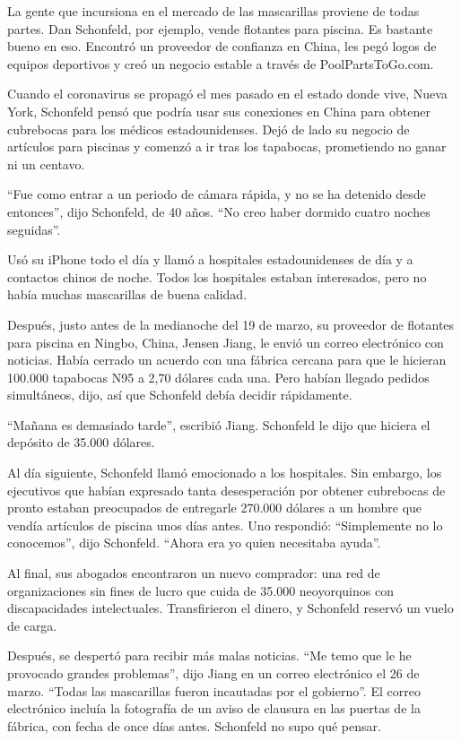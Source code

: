 La gente que incursiona en el mercado de las mascarillas proviene de
todas partes. Dan Schonfeld, por ejemplo, vende flotantes para piscina.
Es bastante bueno en eso. Encontró un proveedor de confianza en China,
les pegó logos de equipos deportivos y creó un negocio estable a través
de PoolPartsToGo.com.

Cuando el coronavirus se propagó el mes pasado en el estado donde vive,
Nueva York, Schonfeld pensó que podría usar sus conexiones en China para
obtener cubrebocas para los médicos estadounidenses. Dejó de lado su
negocio de artículos para piscinas y comenzó a ir tras los tapabocas,
prometiendo no ganar ni un centavo.

``Fue como entrar a un periodo de cámara rápida, y no se ha detenido
desde entonces'', dijo Schonfeld, de 40 años. ``No creo haber dormido
cuatro noches seguidas''.

Usó su iPhone todo el día y llamó a hospitales estadounidenses de día y
a contactos chinos de noche. Todos los hospitales estaban interesados,
pero no había muchas mascarillas de buena calidad.

Después, justo antes de la medianoche del 19 de marzo, su proveedor de
flotantes para piscina en Ningbo, China, Jensen Jiang, le envió un
correo electrónico con noticias. Había cerrado un acuerdo con una
fábrica cercana para que le hicieran 100.000 tapabocas N95 a 2,70
dólares cada una. Pero habían llegado pedidos simultáneos, dijo, así que
Schonfeld debía decidir rápidamente.

``Mañana es demasiado tarde'', escribió Jiang. Schonfeld le dijo que
hiciera el depósito de 35.000 dólares.

Al día siguiente, Schonfeld llamó emocionado a los hospitales. Sin
embargo, los ejecutivos que habían expresado tanta desesperación por
obtener cubrebocas de pronto estaban preocupados de entregarle 270.000
dólares a un hombre que vendía artículos de piscina unos días antes. Uno
respondió: ``Simplemente no lo conocemos'', dijo Schonfeld. ``Ahora era
yo quien necesitaba ayuda''.

Al final, sus abogados encontraron un nuevo comprador: una red de
organizaciones sin fines de lucro que cuida de 35.000 neoyorquinos con
discapacidades intelectuales. Transfirieron el dinero, y Schonfeld
reservó un vuelo de carga.

Después, se despertó para recibir más malas noticias. ``Me temo que le
he provocado grandes problemas'', dijo Jiang en un correo electrónico el
26 de marzo. ``Todas las mascarillas fueron incautadas por el
gobierno''. El correo electrónico incluía la fotografía de un aviso de
clausura en las puertas de la fábrica, con fecha de once días antes.
Schonfeld no supo qué pensar.

